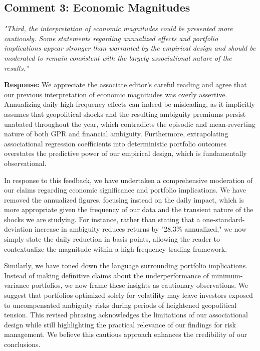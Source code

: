 \documentclass[12pt]{article}
\begin{document}
\subsection*{Comment 3: Economic Magnitudes}
\textit{"Third, the interpretation of economic magnitudes could be presented more cautiously. Some statements regarding annualized effects and portfolio implications appear stronger than warranted by the empirical design and should be moderated to remain consistent with the largely associational nature of the results."}

\begin{highlightbox}
\textbf{Response:} We appreciate the associate editor's careful reading and agree that our previous interpretation of economic magnitudes was overly assertive. Annualizing daily high-frequency effects can indeed be misleading, as it implicitly assumes that geopolitical shocks and the resulting ambiguity premiums persist unabated throughout the year, which contradicts the episodic and mean-reverting nature of both GPR and financial ambiguity. Furthermore, extrapolating associational regression coefficients into deterministic portfolio outcomes overstates the predictive power of our empirical design, which is fundamentally observational.

In response to this feedback, we have undertaken a comprehensive moderation of our claims regarding economic significance and portfolio implications. We have removed the annualized figures, focusing instead on the daily impact, which is more appropriate given the frequency of our data and the transient nature of the shocks we are studying. For instance, rather than stating that a one-standard-deviation increase in ambiguity reduces returns by "28.3\% annualized," we now simply state the daily reduction in basis points, allowing the reader to contextualize the magnitude within a high-frequency trading framework.

Similarly, we have toned down the language surrounding portfolio implications. Instead of making definitive claims about the underperformance of minimum-variance portfolios, we now frame these insights as cautionary observations. We suggest that portfolios optimized solely for volatility may leave investors exposed to uncompensated ambiguity risks during periods of heightened geopolitical tension. This revised phrasing acknowledges the limitations of our associational design while still highlighting the practical relevance of our findings for risk management. We believe this cautious approach enhances the credibility of our conclusions.
\end{highlightbox}
\end{document}
